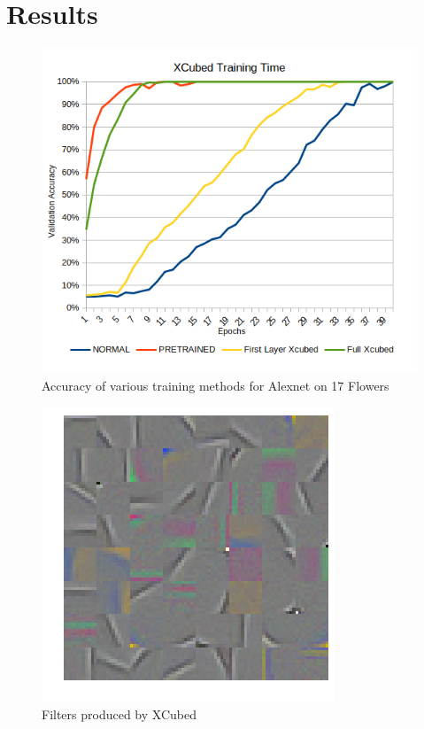 \documentclass{article}
\begin{document}
\section{Results}
\begin{figure}
    \centering
    \includegraphics[width=.8\linewidth]{X3GRAPH}
    \caption{Accuracy of various training methods for Alexnet on 17 Flowers}
    \label{fig:netspeedup}
\end{figure}
\begin{figure}
    \centering
    \includegraphics[width=.8\linewidth]{x3filters}
    \caption{Filters produced by XCubed}
    \label{fig:x3weights}
\end{figure}
\end{document}
